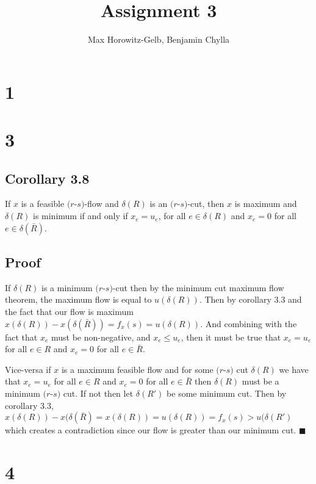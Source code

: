 \documentclass[]{article}
\title{Assignment 3}
\author{Max Horowitz-Gelb, Benjamin Chylla}
\newcommand*{\QEDA}{\hfill\ensuremath{\blacksquare}}%
\begin{document}
\maketitle

\section*{1}
\section*{3}
\subsection*{Corollary 3.8}	
If $x$ is a feasible $(r$-$s)$-flow and $\delta(R)$ is an $(r$-$s)$-cut, then $x$ is maximum and $\delta(R)$ is minimum if and only if
$x_e = u_e$, for all $e \in \delta(R)$ and $x_e = 0$ for all $e \in \delta(\bar{R})$.
\subsection*{Proof}
If $\delta(R)$ is a minimum $(r$-$s)$-cut then by the minimum cut maximum flow theorem, the maximum flow is equal to $u(\delta(R))$.  
Then by corollary 3.3 and the fact that our flow is maximum $x(\delta(R)) - x(\delta(\bar{R})) = f_x(s) = u(\delta(R))$. And combining with the fact that $x_e$ must be non-negative, and $x_e \leq u_e$, then it must be true that $x_e = u_e$ for all $e \in R$ and $x_e = 0$ for all $e \in \bar{R}$.

Vice-versa if $x$ is a maximum feasible flow and for some $(r$-$s)$ cut $\delta(R)$ we have that $x_e = u_e$ for all $e \in R$ and $x_e = 0$ for all $e \in \bar{R}$ then $\delta(R)$ must be a minimum $(r$-$s)$ cut. If not then let $\delta(R')$ be some minimum cut. Then by corollary 3.3, $x(\delta(R)) - x(\delta(\bar{R}) = x(\delta(R)) = u(\delta(R)) = f_x(s) > u(\delta(R')$ which creates a contradiction since our flow is greater than our minimum cut.
\QEDA

\section*{4}
\end{document}
